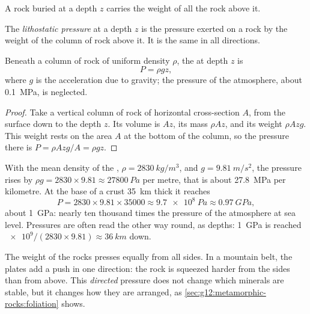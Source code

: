 A rock buried at a depth $z$ carries the weight of all the rock above it.

\begin{definition}\label{def:g12:metamorphic-rocks:lithostatic}
The \emph{lithostatic pressure} at a depth $z$
is the pressure exerted on a rock by the weight of the column of rock above
it. It is the same in all directions.
\end{definition}

\begin{proposition}\label{prop:g12:metamorphic-rocks:lithostatic}
Beneath a column of rock of uniform density $\rho$, the 
at depth $z$ is
\[
  P = \rho g z ,
\]
where $g$ is the acceleration due to gravity; the pressure of the
atmosphere, about \qty{0.1}{MPa}, is neglected.
\end{proposition}

\begin{proof}
Take a vertical column of rock of horizontal cross-section $A$, from the
surface down to the depth $z$. Its volume is $Az$, its mass $\rho A z$, and
its weight $\rho A z g$. This weight rests on the area $A$ at the bottom of
the column, so the pressure there is $P = \rho A z g / A = \rho g z$.
\end{proof}

With the mean density of the , $\rho = \qty{2830}{kg/m^3}$,
and $g = \qty{9.81}{m/s^2}$, the pressure rises by $\rho g = 2830 \times 9.81
\approx \qty{27800}{Pa}$ per metre, that is about \qty{27.8}{MPa} per
kilometre. At the base of a crust \qty{35}{km} thick it reaches
\[
  P = 2830 \times 9.81 \times \num{35000} \approx \qty{9.7e8}{Pa} \approx
  \qty{0.97}{GPa},
\]
about \qty{1}{GPa}: nearly ten thousand times the pressure of the atmosphere
at sea level. Pressures are often read the other way round, as depths:
\qty{1}{GPa} is reached $\num{e9}/(2830 \times 9.81) \approx \qty{36}{km}$
down.

The weight of the rocks presses equally from all sides. In a mountain belt,
the plates add a push in one direction: the rock is squeezed harder from the
sides than from above. This \emph{directed} pressure does not change which
minerals are stable, but it changes how they are arranged, as
\cref{sec:g12:metamorphic-rocks:foliation} shows.

